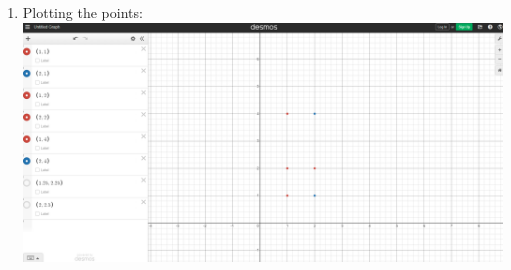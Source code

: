 \documentclass[10pt]{exam}
\begin{document}
\begin{enumerate}
    \item Plotting the points: \\ 
    \includegraphics[scale = .3]{1.png}
    

\end{enumerate}
\end{document}
